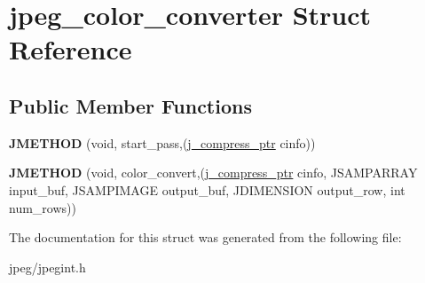 \hypertarget{structjpeg__color__converter}{}\section{jpeg\+\_\+color\+\_\+converter Struct Reference}
\label{structjpeg__color__converter}
\subsection*{Public Member Functions}
\begin{DoxyCompactItemize}
\item 
{\bfseries J\+M\+E\+T\+H\+OD} (void, start\+\_\+pass,(\hyperlink{structjpeg__compress__struct}{j\+\_\+compress\+\_\+ptr} cinfo))\hypertarget{structjpeg__color__converter_a1c9f24e568c3d4f67cb2021066825997}{}\label{structjpeg__color__converter_a1c9f24e568c3d4f67cb2021066825997}

\item 
{\bfseries J\+M\+E\+T\+H\+OD} (void, color\+\_\+convert,(\hyperlink{structjpeg__compress__struct}{j\+\_\+compress\+\_\+ptr} cinfo, J\+S\+A\+M\+P\+A\+R\+R\+AY input\+\_\+buf, J\+S\+A\+M\+P\+I\+M\+A\+GE output\+\_\+buf, J\+D\+I\+M\+E\+N\+S\+I\+ON output\+\_\+row, int num\+\_\+rows))\hypertarget{structjpeg__color__converter_aed90a059ad823add4785973694ed5eb9}{}\label{structjpeg__color__converter_aed90a059ad823add4785973694ed5eb9}

\end{DoxyCompactItemize}


The documentation for this struct was generated from the following file\+:\begin{DoxyCompactItemize}
\item 
jpeg/jpegint.\+h\end{DoxyCompactItemize}
